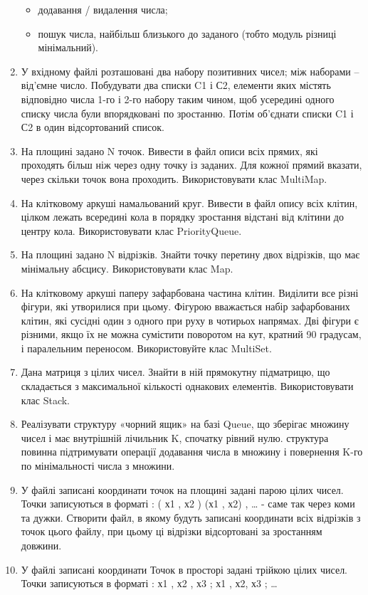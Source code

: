 \documentclass[]{article}
\begin{document}
\begin{enumerate}
  \begin{itemize}
  \item
    додавання / видалення числа;
  \item
    пошук числа, найбільш близького до заданого (тобто модуль різниці
    мінімальний).
  \end{itemize}
\item
  У вхідному файлі розташовані два набору позитивних чисел; між наборами
  -- від'ємне число. Побудувати два списки C1 і С2, елементи яких
  містять відповідно числа 1-го і 2-го набору таким чином, щоб усередині
  одного списку числа були впорядковані по зростанню. Потім об'єднати
  списки C1 і С2 в один відсортований список.
\item
  На площині задано N точок. Вивести в файл описи всіх прямих, які
  проходять більш ніж через одну точку із заданих. Для кожної прямий
  вказати, через скільки точок вона проходить. Використовувати клас
  MultiMap.
\item
  На клітковому аркуші намальований круг. Вивести в файл опису всіх
  клітин, цілком лежать всередині кола в порядку зростання відстані від
  клітини до центру кола. Використовувати клас PriorityQueue.
\item
  На площині задано N відрізків. Знайти точку перетину двох відрізків,
  що має мінімальну абсцису. Використовувати клас Map.
\item
  На клітковому аркуші паперу зафарбована частина клітин. Виділити все
  різні фігури, які утворилися при цьому. Фігурою вважається набір
  зафарбованих клітин, які сусідні один з одного при руху в чотирьох
  напрямах. Дві фігури є різними, якщо їх не можна сумістити поворотом
  на кут, кратний 90 градусам, і паралельним переносом. Використовуйте
  клас MultiSet.
\item
  Дана матриця з цілих чисел. Знайти в ній прямокутну підматрицю, що
  складається з максимальної кількості однакових елементів.
  Використовувати клас Stack.
\item
  Реалізувати структуру «чорний ящик» на базі Queue, що зберігає множину
  чисел і має внутрішній лічильник K, спочатку рівний нулю. структура
  повинна підтримувати операції додавання числа в множину і повернення
  K-го по мінімальності числа з множини.
\item
  У файлі записані координати точок на площині задані парою цілих чисел.
  Точки записуються в форматі : ( х1 , х2 ) (х1 , х2) , \ldots{} - саме
  так через коми та дужки. Створити файл, в якому будуть записані
  координати всіх відрізків з точок цього файлу, при цьому ці відрізки
  відсортовані за зростанням довжини.
\item
  У файлі записані координати Точок в просторі задані трійкою цілих
  чисел. Точки записуються в форматі : х1 , х2 , х3 ; х1 , х2, х3 ;
  \ldots{}
\end{enumerate}
\end{document}
